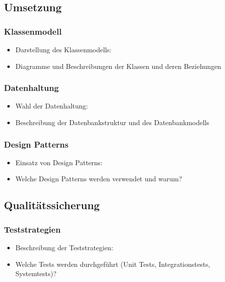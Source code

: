 \subsection{Umsetzung}\label{umsetzung}

\subsubsection{Klassenmodell}\label{klassenmodell}

\begin{itemize}
  \item
        Darstellung des Klassenmodells:
  \item
        Diagramme und Beschreibungen der Klassen und deren Beziehungen
\end{itemize}

\subsubsection{Datenhaltung}\label{datenhaltung}

\begin{itemize}
  \item
        Wahl der Datenhaltung:
  \item
        Beschreibung der Datenbankstruktur und des Datenbankmodells
\end{itemize}

\subsubsection{Design Patterns}\label{design-patterns}

\begin{itemize}
  \item
        Einsatz von Design Patterns:
  \item
        Welche Design Patterns werden verwendet und warum?
\end{itemize}

\subsection{Qualitätssicherung}\label{qualituxe4tssicherung}

\subsubsection{Teststrategien}\label{teststrategien}

\begin{itemize}
  \item
        Beschreibung der Teststrategien:
  \item
        Welche Tests werden durchgeführt (Unit Tests, Integrationstests, Systemtests)?
\end{itemize}

